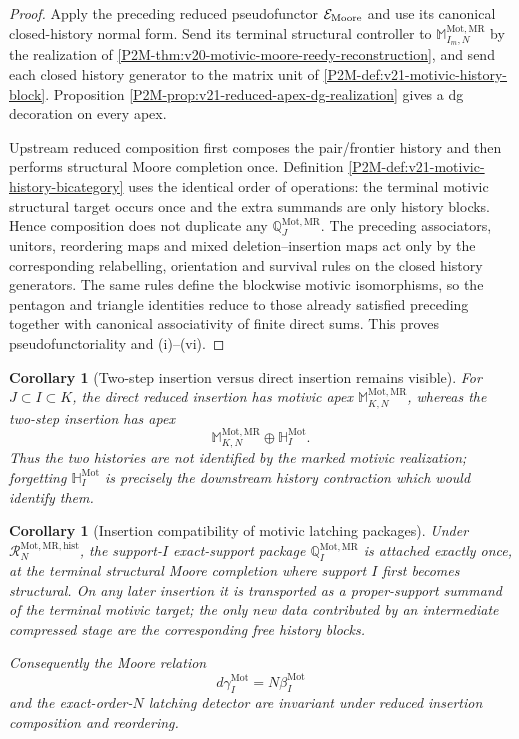 \documentclass[11pt]{article}
\newtheorem{corollary}[theorem]{Corollary}
\theoremstyle{remark}
\newcommand{\Mot}{\mathrm{Mot}}
\newcommand{\MR}{\mathrm{MR}}
\begin{document}
\begin{proof}
Apply the preceding reduced pseudofunctor $\mathcal E_{\rm Moore}$ and use its
canonical closed-history normal form.  Send its terminal structural controller
to $\mathbb M_{I_m,N}^{\Mot,\MR}$ by the realization of
\cref{P2M-thm:v20-motivic-moore-reedy-reconstruction}, and send each closed history
generator to the matrix unit of
\cref{P2M-def:v21-motivic-history-block}.  Proposition
\ref{P2M-prop:v21-reduced-apex-dg-realization} gives a dg decoration on every apex.

Upstream reduced composition first composes the pair/frontier history and then
performs structural Moore completion once.  Definition
\ref{P2M-def:v21-motivic-history-bicategory} uses the identical order of operations:
the terminal motivic structural target occurs once and the extra summands are
only history blocks.  Hence composition does not duplicate any
$\mathbb Q_J^{\Mot,\MR}$.  The preceding associators, unitors, reordering maps
and mixed deletion--insertion maps act only by the corresponding relabelling,
orientation and survival rules on the closed history generators.  The same
rules define the blockwise motivic isomorphisms, so the pentagon and triangle
identities reduce to those already satisfied preceding together with canonical
associativity of finite direct sums.  This proves pseudofunctoriality and
\textup{(i)--(vi)}.
\end{proof}

\begin{corollary}[Two-step insertion versus direct insertion remains visible]
\label{P2M-cor:v21-two-step-history-block}
For $J\subset I\subset K$, the direct reduced insertion has motivic apex
$\mathbb M_{K,N}^{\Mot,\MR}$, whereas the two-step insertion has apex
\begin{equation}
 \boxed{
 \mathbb M_{K,N}^{\Mot,\MR}\oplus\mathbb H_I^{\Mot}.}
\end{equation}
Thus the two histories are not identified by the marked motivic realization;
forgetting $\mathbb H_I^{\Mot}$ is precisely the downstream history
contraction which would identify them.
\end{corollary}

\begin{corollary}[Insertion compatibility of motivic latching packages]
\label{P2M-cor:v21-insertion-latching-compatibility}
Under $\mathcal R_N^{\Mot,\MR,\mathrm{hist}}$, the support-$I$ exact-support
package $\mathbb Q_I^{\Mot,\MR}$ is attached exactly once, at the terminal
structural Moore completion where support $I$ first becomes structural.  On any
later insertion it is transported as a proper-support summand of the terminal
motivic target; the only new data contributed by an intermediate compressed
stage are the corresponding free history blocks.

Consequently the Moore relation
\[
 d\gamma_I^{\Mot}=N\beta_I^{\Mot}
\]
and the exact-order-$N$ latching detector are invariant under reduced insertion
composition and reordering.
\end{corollary}
\end{document}
